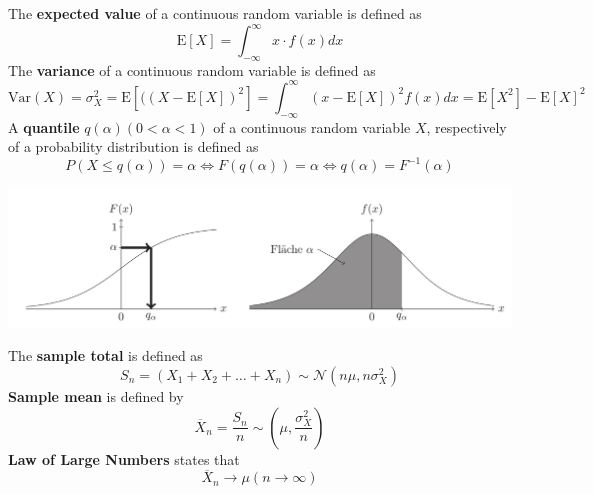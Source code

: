 \documentclass[11pt]{article}
\theoremstyle{definition}
\newcommand*\samplemean[1]{\overline{#1}}
\newcommand*\ev[1]{\mathrel{\text{E}\left[#1\right]}}
\newcommand*\N[1]{\mathcal{N}\left(#1\right)}
\begin{document}
\begin{definition}
	The \textbf{expected value} of a continuous random variable is defined as
	\begin{equation*}
			\ev{X} = \int_{-\infty}^{\infty} x\cdot f(x) dx
	\end{equation*}
	The \textbf{variance} of a continuous random variable is defined as
	\begin{equation*}
		\text{Var}(X) = \sigma_X^2 = \ev{((X - \ev{X})^2} = \int_{-\infty}^{\infty} (x - \ev{X})^2 f(x) dx = \ev{X^2} - \ev{X}^2
	\end{equation*}
	A \textbf{quantile} $q(\alpha) (0<\alpha<1)$ of a continuous random variable $X$, respectively of a probability distribution is defined as
	\begin{equation*}
		P(X\leq q(\alpha)) = \alpha \Leftrightarrow F(q(\alpha)) = \alpha \Leftrightarrow q(\alpha) = F^{-1}(\alpha)
	\end{equation*}
\end{definition}

\begin{center}
	\includegraphics[width=0.8\linewidth]{img/quantile}
\end{center}

\begin{definition}
	The \textbf{sample total} is defined as 
	\begin{equation*}
		S_n = (X_1 + X_2 + \dots + X_n) \sim \N{n\mu, n\sigma_X^2}
	\end{equation*}
	\textbf{Sample mean} is defined by
	\begin{equation*}
		\samplemean{X}_n = \frac{S_n}{n} \sim(\mu, \frac{\sigma_X^2}{n})
	\end{equation*}
	\textbf{Law of Large Numbers} states that
	\begin{equation*}
		\samplemean{X}_n \longrightarrow \mu(n\rightarrow \infty)
	\end{equation*}
\end{definition}
\end{document}
